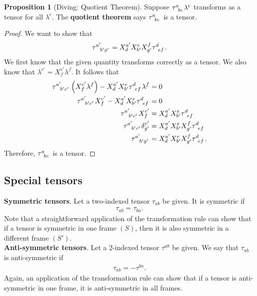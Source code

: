 \documentclass{book}
\theoremstyle{definition}
\newtheorem{prop}{Proposition}[section]
\begin{document}
\begin{prop}[Diving: Quotient Theorem]
	Suppose $\tensor{\tau}{^{a}_{bc}}\lambda^c$ transforms as a tensor for all $\lambda^c$. The \textbf{quotient theorem} says $\tensor{\tau}{^{a}_{bc}}$ is a tensor.  
\end{prop} 
\begin{proof}
	We want to show that 
	\begin{align*}
	\tensor{\tau}{^{a'}_{b'g'}} = X^{a'}_dX^{e}_{b'}X^{f}_{g'} \tensor{\tau}{^d_{ef}}.
	\end{align*}
	We first know that the given quantity transforms correctly as a tensor. We also know that $\lambda^{c'} = X^{c'}_f\lambda^f$. It follows that
	\begin{align*}
	\tensor{\tau}{^{a'}_{b'c'}}\left( X^{c'}_f\lambda^f \right) - X^{a'}_dX^{e}_{b'}\tensor{\tau}{^d_{ef}}\lambda^f &= 0\\
	\tensor{\tau}{^{a'}_{b'c'}}X^{c'}_f - X^{a'}_dX^{e}_{b'}\tensor{\tau}{^d_{ef}} &= 0\\
	\tensor{\tau}{^{a'}_{b'c'}}X^{c'}_f &= X^{a'}_dX^{e}_{b'}\tensor{\tau}{^d_{ef}}\\
	\tensor{\tau}{^{a'}_{b'c'}}\delta^{c'}_{g'} &= X^{a'}_dX^{e}_{b'}X^{f}_{g'}\tensor{\tau}{^d_{ef}}\\
	\tensor{\tau}{^{a'}_{b'g'}}&=X^{a'}_dX^{e}_{b'}X^{f}_{g'}\tensor{\tau}{^d_{ef}}.
	\end{align*}
	Therefore, $\tensor{\tau}{^{a}_{bc}}$ is a tensor. 
\end{proof}

\subsection{Special tensors}
\textbf{Symmetric tensors}. Let a two-indexed tensor $\tau_{ab}$ be given. It is symmetric if
\begin{align*}
\tau_{ab} = \tau_{ba}.
\end{align*}
Note that a straightforward application of the transformation rule can show that if a tensor is symmetric in one frame $(S)$, then it is also symmetric in a different frame $(S')$.\\

\noindent \textbf{Anti-symmetric tensors}. Let a 2-indexed tensor $\tau^{ab}$ be given. We say that $\tau_{ab}$ is anti-symmetric if
\begin{align*}
\tau_{ab} = -\tau^{ba}.
\end{align*}
Again, an application of the transformation rule can show that if a tensor is anti-symmetric in one frame, it is anti-symmetric in all frames. \\
\end{document}
